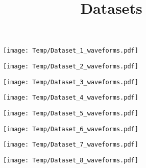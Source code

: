 \documentclass[14pt,a4paper]{extarticle}
\title{Datasets}
\author{}
\date{}
\begin{document}
\begin{figure}
\centering
\texttt{[image: Temp/Dataset\_1\_waveforms.pdf]}
\end{figure}

\begin{figure}
\centering
\texttt{[image: Temp/Dataset\_2\_waveforms.pdf]}
\end{figure}

\begin{figure}
\centering
\texttt{[image: Temp/Dataset\_3\_waveforms.pdf]}
\end{figure}

\begin{figure}
\centering
\texttt{[image: Temp/Dataset\_4\_waveforms.pdf]}
\end{figure}

\begin{figure}
\centering
\texttt{[image: Temp/Dataset\_5\_waveforms.pdf]}
\end{figure}

\begin{figure}
\centering
\texttt{[image: Temp/Dataset\_6\_waveforms.pdf]}
\end{figure}

\begin{figure}
\centering
\texttt{[image: Temp/Dataset\_7\_waveforms.pdf]}
\end{figure}

\begin{figure}
\centering
\texttt{[image: Temp/Dataset\_8\_waveforms.pdf]}
\end{figure}
\end{document}
